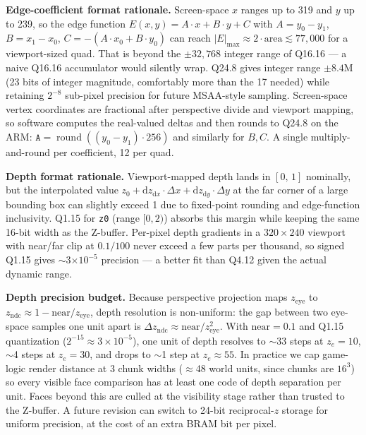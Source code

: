 \documentclass[11pt]{article}
\begin{document}
\noindent\textbf{Edge-coefficient format rationale.} Screen-space $x$ ranges up to 319 and $y$ up to 239, so the edge function $E(x,y) = A\cdot x + B\cdot y + C$ with $A = y_0{-}y_1$, $B = x_1{-}x_0$, $C = -(A\cdot x_0 + B\cdot y_0)$ can reach $|E|_{\max} \approx 2\cdot\text{area} \lesssim 77{,}000$ for a viewport-sized quad. That is beyond the $\pm 32{,}768$ integer range of Q16.16 --- a naive Q16.16 accumulator would silently wrap. Q24.8 gives integer range $\pm 8.4$M (23 bits of integer magnitude, comfortably more than the 17 needed) while retaining $2^{-8}$ sub-pixel precision for future MSAA-style sampling. Screen-space vertex coordinates are fractional after perspective divide and viewport mapping, so software computes the real-valued deltas and then rounds to Q24.8 on the ARM: $\texttt{A} = \operatorname{round}((y_0 - y_1) \cdot 256)$ and similarly for $B, C$. A single multiply-and-round per coefficient, 12 per quad.

\vspace{0.8em}
\noindent\textbf{Depth format rationale.} Viewport-mapped depth lands in $[0,\,1]$ nominally, but the interpolated value $z_0 + \mathrm{d}z_{\mathrm{d}x}\cdot\Delta x + \mathrm{d}z_{\mathrm{d}y}\cdot\Delta y$ at the far corner of a large bounding box can slightly exceed 1 due to fixed-point rounding and edge-function inclusivity. Q1.15 for \texttt{z0} (range $[0, 2)$) absorbs this margin while keeping the same 16-bit width as the Z-buffer. Per-pixel depth gradients in a $320\times240$ viewport with near/far clip at $0.1/100$ never exceed a few parts per thousand, so signed Q1.15 gives $\sim$3$\times 10^{-5}$ precision --- a better fit than Q4.12 given the actual dynamic range.

\noindent\textbf{Depth precision budget.} Because perspective projection maps $z_{\text{eye}}$ to $z_{\text{ndc}} \approx 1 - \text{near}/z_{\text{eye}}$, depth resolution is non-uniform: the gap between two eye-space samples one unit apart is $\Delta z_{\text{ndc}} \approx \text{near}/z_{\text{eye}}^2$. With $\text{near} = 0.1$ and Q1.15 quantization ($2^{-15} \approx 3 \times 10^{-5}$), one unit of depth resolves to $\sim$33 steps at $z_e = 10$, $\sim$4 steps at $z_e = 30$, and drops to $\sim$1 step at $z_e \approx 55$. In practice we cap game-logic render distance at 3 chunk widths ($\approx$48 world units, since chunks are $16^3$) so every visible face comparison has at least one code of depth separation per unit. Faces beyond this are culled at the visibility stage rather than trusted to the Z-buffer. A future revision can switch to 24-bit reciprocal-$z$ storage for uniform precision, at the cost of an extra BRAM bit per pixel.
\end{document}
